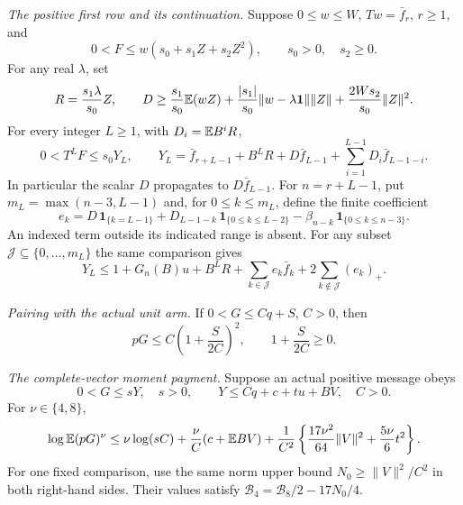 \begin{theorem}
\label{thm:unit-two-step-transport}
\smallskip\noindent
\textit{The positive first row and its continuation.}
Suppose $0\le w\le W$, $Tw=\bar f_r$, $r\ge1$, and
\[
 0<F\le w(s_0+s_1Z+s_2Z^2),\qquad s_0>0,\quad s_2\ge0.
\]
For any real $\lambda$, set
\[
 R=\frac{s_1\lambda}{s_0}Z,
\qquad
 D\ge\frac{s_1}{s_0}\mathbb E(wZ)
       +\frac{|s_1|}{s_0}\|w-\lambda\mathbf1\|\|Z\|
       +\frac{2Ws_2}{s_0}\|Z\|^2.
\]
For every integer $L\ge1$, with $D_i=\mathbb E B^iR$,
\begin{equation}\label{eq:unit-two-step:finite-row}
 0<T^LF\le s_0Y_L,\qquad
 Y_L=\bar f_{r+L-1}+B^LR+D\bar f_{L-1}
             +\sum_{i=1}^{L-1}D_i\bar f_{L-1-i}.
\end{equation}
In particular the scalar $D$ propagates to $D\bar f_{L-1}$.
For $n=r+L-1$, put $m_L=\max(n-3,L-1)$ and, for
$0\le k\le m_L$, define the finite coefficient
\begin{equation}\label{eq:unit-two-step:path-ledger}
 e_k=D\,\mathbf1_{\{k=L-1\}}
 +D_{L-1-k}\,\mathbf1_{\{0\le k\le L-2\}}
 -\beta_{n-k}\,\mathbf1_{\{0\le k\le n-3\}}.
\end{equation}
An indexed term outside its indicated range is absent. For any subset
$\mathcal J\subseteq\{0,\ldots,m_L\}$ the same comparison gives
\begin{equation}\label{eq:unit-two-step:retained-ledger}
 Y_L\le1+G_n(B)u+B^LR
       +\sum_{k\in\mathcal J}e_k\bar f_k
       +2\sum_{k\notin\mathcal J}(e_k)_+.
\end{equation}

\smallskip\noindent
\textit{Pairing with the actual unit arm.}
If $0<G\le Cq+S$, $C>0$, then
\begin{equation}\label{eq:unit-two-step:unit-pairing}
 pG\le C\left(1+\frac{S}{2C}\right)^2,
 \qquad 1+\frac{S}{2C}\ge0.
\end{equation}

\smallskip\noindent
\textit{The complete-vector moment payment.}
Suppose an actual positive message obeys
\[
 0<G\le sY,\quad s>0,\qquad
 Y\le Cq+c+t u+BV,\quad C>0.
\]
For $\nu\in\{4,8\}$,
\begin{equation}\label{eq:unit-two-step:moment-payment}
 \log\mathbb E(pG)^\nu\le\nu\log(sC)+\frac\nu C(c+\mathbb E BV)
 +\frac1{C^2}\left\{
       \frac{17\nu^2}{64}\|V\|^2
                    +\frac{5\nu}{6}t^2\right\}.
\end{equation}
For one fixed comparison, use the same norm upper bound
$N_0\ge\|V\|^2/C^2$ in both right-hand sides.
Their values satisfy $\mathcal B_4=\mathcal B_8/2-17N_0/4$.


\end{theorem}
